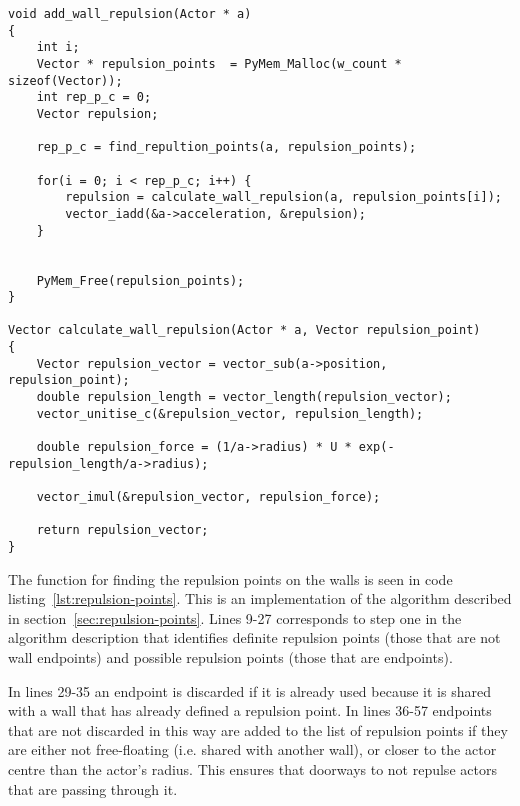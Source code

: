 \begin{lstlisting}[caption={Code to calculate the repulsion from the 
    walls.},label=lst:wall-repulsion]
void add_wall_repulsion(Actor * a)
{
    int i;
    Vector * repulsion_points  = PyMem_Malloc(w_count * sizeof(Vector));
    int rep_p_c = 0;
    Vector repulsion;

    rep_p_c = find_repultion_points(a, repulsion_points);

    for(i = 0; i < rep_p_c; i++) {
        repulsion = calculate_wall_repulsion(a, repulsion_points[i]);
        vector_iadd(&a->acceleration, &repulsion);
    }


    PyMem_Free(repulsion_points);
}

Vector calculate_wall_repulsion(Actor * a, Vector repulsion_point)
{
    Vector repulsion_vector = vector_sub(a->position, repulsion_point);
    double repulsion_length = vector_length(repulsion_vector);
    vector_unitise_c(&repulsion_vector, repulsion_length);

    double repulsion_force = (1/a->radius) * U * exp(-repulsion_length/a->radius);

    vector_imul(&repulsion_vector, repulsion_force);

    return repulsion_vector;
}
\end{lstlisting}

The function for finding the repulsion points on the walls is seen in code 
listing~\ref{lst:repulsion-points}. This is an implementation of the algorithm 
described in section~\ref{sec:repulsion-points}. Lines 9-27 corresponds to 
step one in the algorithm description that identifies definite repulsion 
points (those that are not wall endpoints) and possible repulsion points 
(those that are endpoints).

In lines 29-35 an endpoint is discarded if it is already used because it is 
shared with a wall that has already defined a repulsion point. In lines 36-57 
endpoints that are not discarded in this way are added to the list of 
repulsion points if they are either not free-floating (i.e. shared with 
another wall), or closer to the actor centre than the actor's radius. This 
ensures that doorways to not repulse actors that are passing through it.

